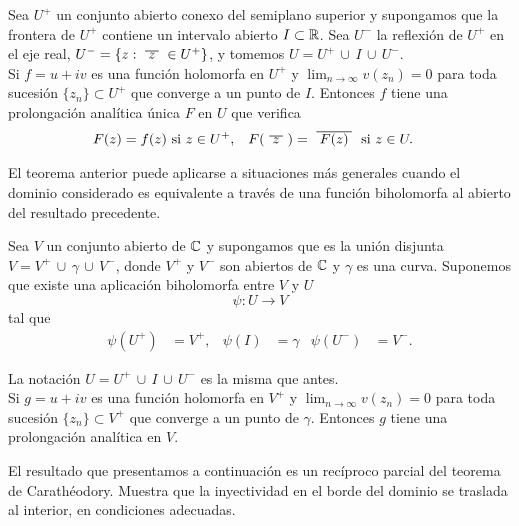 \begin{theorem}
    Sea $U^+$ un conjunto abierto conexo del semiplano superior y supongamos que la frontera de $U^+$ contiene un intervalo abierto $I \subset \mathbb{R}$. Sea $U^-$ la reflexión de $U^+$ en el eje real, $U^- = \{z: \xbar{z} \in U^+\}$, y  tomemos $U = U^+ \, \cup \, I \, \cup \, U^-$. \\

    Si $f = u + iv$ es una función holomorfa en $U^+$ y $\lim_{n \to \infty} v(z_n) = 0$ para toda sucesión $\{z_n\}\subset U^+$ que converge a un punto de $I$. Entonces $f$ tiene una prolongación analítica única $F$ en $U$ que verifica
    \begin{align*}
        F(z) &= f(z) \text{ si } z\in U^+, & F(\xbar{z}) &= \xbar{F(z)} \text{ si } z\in U.
    \end{align*}
\end{theorem}

El teorema anterior puede aplicarse a situaciones más generales cuando el dominio considerado es equivalente a través de una función biholomorfa al abierto del resultado precedente. \\

\begin{theorem}
    Sea $V$ un conjunto abierto de $\mathbb{C}$ y supongamos que es la unión disjunta $V = V^+ \, \cup \, \gamma \, \cup \, V^-$, donde $V^+$ y $V^-$ son abiertos de $\mathbb{C}$ y $\gamma$ es una curva. Suponemos que existe una aplicación biholomorfa entre $V$ y $U$
    \begin{equation*}
        \psi: U \to V
    \end{equation*}
    tal que
    \begin{align*}
        \psi(U^+) &= V^+, & \psi(I) &= \gamma & \psi(U^-) &= V^-.
    \end{align*}

    La notación $U = U^+ \, \cup \, I \, \cup \, U^-$ es la misma que antes. \\

    Si $g = u + iv$ es una función holomorfa en $V^+$ y $\lim_{n \to \infty} v(z_n) = 0$ para toda sucesión $\{z_n\}\subset V^+$ que converge a un punto de $\gamma$. Entonces $g$ tiene una prolongación analítica en $V$.
\end{theorem}


El resultado que presentamos a continuación es un recíproco parcial del teorema de Carathéodory. Muestra que la inyectividad en el borde del dominio se traslada al interior, en condiciones adecuadas. \\

